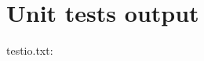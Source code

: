 \section{Unit tests output}

\begin{scriptsize}
\begin{ttfamily}

\end{ttfamily}
\end{scriptsize}

testio.txt:\\
\begin{scriptsize}
\begin{ttfamily}

\end{ttfamily}
\end{scriptsize}

